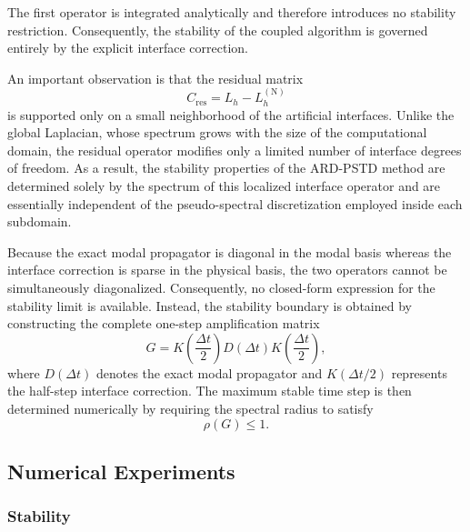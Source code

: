 \documentclass{Configuration_Files/PoliMi3i_thesis}
\begin{document}
The first operator is integrated analytically and therefore introduces no stability restriction. Consequently, the stability of the coupled algorithm is governed entirely by the explicit interface correction.

An important observation is that the residual matrix
\[
C_{\mathrm{res}}
=
L_h
-
L_h^{(\mathrm N)}
\]
is supported only on a small neighborhood of the artificial interfaces. Unlike the global Laplacian, whose spectrum grows with the size of the computational domain, the residual operator modifies only a limited number of interface degrees of freedom. As a result, the stability properties of the ARD-PSTD method are determined solely by the spectrum of this localized interface operator and are essentially independent of the pseudo-spectral discretization employed inside each subdomain.

Because the exact modal propagator is diagonal in the modal basis whereas the interface correction is sparse in the physical basis, the two operators cannot be simultaneously diagonalized. Consequently, no closed-form expression for the stability limit is available. Instead, the stability boundary is obtained by constructing the complete one-step amplification matrix
\[
G
=
K\!\left(\frac{\Delta t}{2}\right)
D(\Delta t)
K\!\left(\frac{\Delta t}{2}\right),
\]
where $D(\Delta t)$ denotes the exact modal propagator and $K(\Delta t/2)$ represents the half-step interface correction. The maximum stable time step is then determined numerically by requiring the spectral radius to satisfy
\[
\rho(G)\le1.
\]

\subsection{Numerical Experiments}

\subsubsection{Stability}
\end{document}
